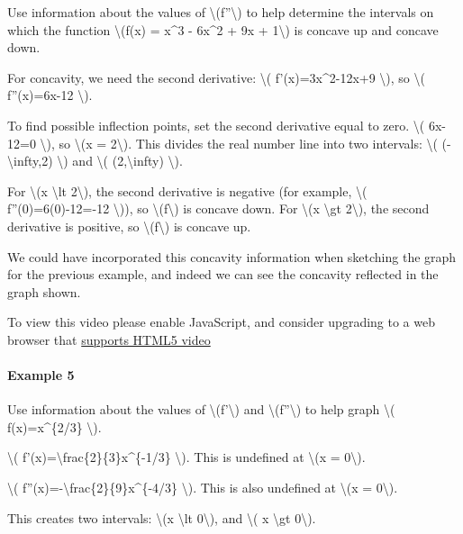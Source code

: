 Use information about the values of
\textbackslash{}(f''\textbackslash{}) to help determine the intervals on
which the function \textbackslash{}(f(x) = x\^{}3 - 6x\^{}2 + 9x +
1\textbackslash{}) is concave up and concave down.

For concavity, we need the second derivative: \textbackslash{}(
f'(x)=3x\^{}2-12x+9 \textbackslash{}), so \textbackslash{}( f''(x)=6x-12
\textbackslash{}).

To find possible inflection points, set the second derivative equal to
zero. \textbackslash{}( 6x-12=0 \textbackslash{}), so \textbackslash{}(x
= 2\textbackslash{}). This divides the real number line into two
intervals: \textbackslash{}( (-\textbackslash{}infty,2)
\textbackslash{}) and \textbackslash{}( (2,\textbackslash{}infty)
\textbackslash{}).

For \textbackslash{}(x \textbackslash{}lt 2\textbackslash{}), the second
derivative is negative (for example, \textbackslash{}(
f''(0)=6(0)-12=-12 \textbackslash{})), so
\textbackslash{}(f\textbackslash{}) is concave down. For
\textbackslash{}(x \textbackslash{}gt 2\textbackslash{}), the second
derivative is positive, so \textbackslash{}(f\textbackslash{}) is
concave up.

We could have incorporated this concavity information when sketching the
graph for the previous example, and indeed we can see the concavity
reflected in the graph shown.

To view this video please enable JavaScript, and consider upgrading to a
web browser that \href{http://videojs.com/html5-video-support/}{supports
HTML5 video}

\hypertarget{example-5}{%
\paragraph{Example 5}\label{example-5}}

Use information about the values of \textbackslash{}(f'\textbackslash{})
and \textbackslash{}(f''\textbackslash{}) to help graph
\textbackslash{}( f(x)=x\^{}\{2/3\} \textbackslash{}).

\textbackslash{}( f'(x)=\textbackslash{}frac\{2\}\{3\}x\^{}\{-1/3\}
\textbackslash{}). This is undefined at \textbackslash{}(x =
0\textbackslash{}).

\textbackslash{}( f''(x)=-\textbackslash{}frac\{2\}\{9\}x\^{}\{-4/3\}
\textbackslash{}). This is also undefined at \textbackslash{}(x =
0\textbackslash{}).

This creates two intervals: \textbackslash{}(x \textbackslash{}lt
0\textbackslash{}), and \textbackslash{}( x \textbackslash{}gt
0\textbackslash{}).

